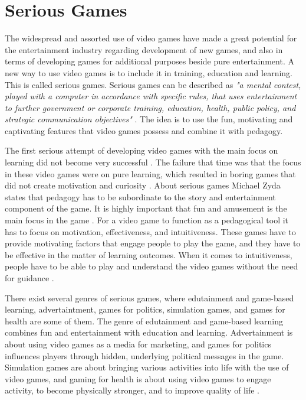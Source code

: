 \section{Serious Games}
\label{sec:sergames}
The widespread and assorted use of video games have made a great potential for the entertainment industry regarding development of new games, and also in terms of developing games for additional purposes beside pure entertainment. A new way to use video games is to include it in training, education and learning. This is called serious games. Serious games can be described as \emph{"a mental contest, played with a computer in accordance with specific rules, that uses entertainment to further government or corporate training, education, health, public policy, and strategic communication objectives"} \cite{zyda2005visual}. The idea is to use the fun, motivating and captivating features that video games possess and combine it with pedagogy.

The first serious attempt of developing video games with the main focus on learning did not become very successful \cite{understandingvg}. The failure that time was that the focus in these  video games were on pure learning, which resulted in boring games that did not create motivation and curiosity \cite{understandingvg} \cite{susi2007serious}. About serious games Michael Zyda states that pedagogy has to be subordinate to the story and entertainment component of the game. It is highly important that fun and amusement is the main focus in the game \cite{zyda2005visual}. For a video game to function as a pedagogical tool it has to focus on motivation, effectiveness, and intuitiveness. These games have to provide motivating factors that engage people to play the game, and they have to be effective in the matter of learning outcomes. When it comes to intuitiveness, people have to be able to play and understand the video games without the need for guidance \cite{understandingvg}. 

There exist several genres of serious games, where edutainment and game-based learning, advertaintment, games for politics, simulation games, and games for health are some of them. The genre of edutainment and game-based learning combines fun and entertainment with education and learning. Advertainment is about using video games as a media for marketing, and games for politics influences players through hidden, underlying political messages in the game. Simulation games are about bringing various activities into life with the use of video games, and gaming for health is about using video games to engage activity, to become physically stronger, and to improve quality of life \cite{understandingvg} \cite{alfingewang}. 

